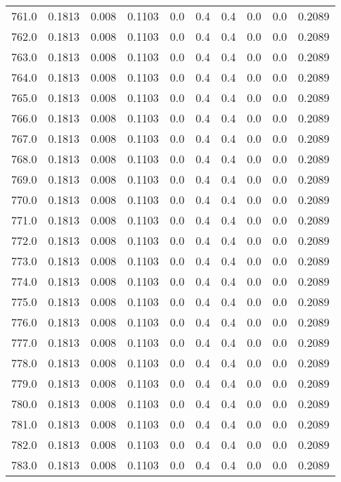 \begin{longtable}{lrrrrrrrrr}
761.0 & 0.1813 & 0.008 & 0.1103 & 0.0 & 0.4 & 0.4 & 0.0 & 0.0 & 0.2089 \\
762.0 & 0.1813 & 0.008 & 0.1103 & 0.0 & 0.4 & 0.4 & 0.0 & 0.0 & 0.2089 \\
763.0 & 0.1813 & 0.008 & 0.1103 & 0.0 & 0.4 & 0.4 & 0.0 & 0.0 & 0.2089 \\
764.0 & 0.1813 & 0.008 & 0.1103 & 0.0 & 0.4 & 0.4 & 0.0 & 0.0 & 0.2089 \\
765.0 & 0.1813 & 0.008 & 0.1103 & 0.0 & 0.4 & 0.4 & 0.0 & 0.0 & 0.2089 \\
766.0 & 0.1813 & 0.008 & 0.1103 & 0.0 & 0.4 & 0.4 & 0.0 & 0.0 & 0.2089 \\
767.0 & 0.1813 & 0.008 & 0.1103 & 0.0 & 0.4 & 0.4 & 0.0 & 0.0 & 0.2089 \\
768.0 & 0.1813 & 0.008 & 0.1103 & 0.0 & 0.4 & 0.4 & 0.0 & 0.0 & 0.2089 \\
769.0 & 0.1813 & 0.008 & 0.1103 & 0.0 & 0.4 & 0.4 & 0.0 & 0.0 & 0.2089 \\
770.0 & 0.1813 & 0.008 & 0.1103 & 0.0 & 0.4 & 0.4 & 0.0 & 0.0 & 0.2089 \\
771.0 & 0.1813 & 0.008 & 0.1103 & 0.0 & 0.4 & 0.4 & 0.0 & 0.0 & 0.2089 \\
772.0 & 0.1813 & 0.008 & 0.1103 & 0.0 & 0.4 & 0.4 & 0.0 & 0.0 & 0.2089 \\
773.0 & 0.1813 & 0.008 & 0.1103 & 0.0 & 0.4 & 0.4 & 0.0 & 0.0 & 0.2089 \\
774.0 & 0.1813 & 0.008 & 0.1103 & 0.0 & 0.4 & 0.4 & 0.0 & 0.0 & 0.2089 \\
775.0 & 0.1813 & 0.008 & 0.1103 & 0.0 & 0.4 & 0.4 & 0.0 & 0.0 & 0.2089 \\
776.0 & 0.1813 & 0.008 & 0.1103 & 0.0 & 0.4 & 0.4 & 0.0 & 0.0 & 0.2089 \\
777.0 & 0.1813 & 0.008 & 0.1103 & 0.0 & 0.4 & 0.4 & 0.0 & 0.0 & 0.2089 \\
778.0 & 0.1813 & 0.008 & 0.1103 & 0.0 & 0.4 & 0.4 & 0.0 & 0.0 & 0.2089 \\
779.0 & 0.1813 & 0.008 & 0.1103 & 0.0 & 0.4 & 0.4 & 0.0 & 0.0 & 0.2089 \\
780.0 & 0.1813 & 0.008 & 0.1103 & 0.0 & 0.4 & 0.4 & 0.0 & 0.0 & 0.2089 \\
781.0 & 0.1813 & 0.008 & 0.1103 & 0.0 & 0.4 & 0.4 & 0.0 & 0.0 & 0.2089 \\
782.0 & 0.1813 & 0.008 & 0.1103 & 0.0 & 0.4 & 0.4 & 0.0 & 0.0 & 0.2089 \\
783.0 & 0.1813 & 0.008 & 0.1103 & 0.0 & 0.4 & 0.4 & 0.0 & 0.0 & 0.2089 \\

\end{longtable}
